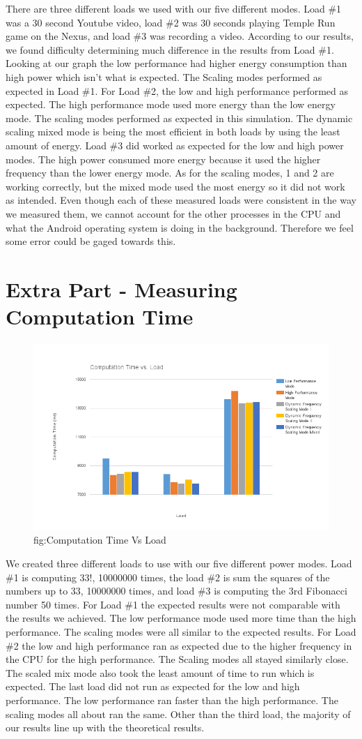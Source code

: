 \documentclass{article} %
\begin{document}
There are three different loads we used with our five different modes.  Load \#1 was a 30 second Youtube video, load \#2 was 30 seconds playing Temple Run game on the Nexus, and load \#3 was recording a video.  According to our results, we found difficulty determining much difference in the results from Load \#1.  Looking at our graph the low performance had higher energy consumption than high power which isn’t what is expected.  The Scaling modes performed as expected in Load \#1.  For Load \#2, the low and high performance performed as expected.  The high performance mode used more energy than the low energy mode.  The scaling modes performed as expected in this simulation.  The dynamic scaling mixed mode is being the most efficient in both loads by using the least amount of energy.  Load \#3 did worked as expected for the low and high power modes.  The high power consumed more energy because it used the higher frequency than the lower energy mode.  As for the scaling modes, 1 and 2 are working correctly, but the mixed mode used the most energy so it did not work as intended.  Even though each of these measured loads were consistent in the way we measured them, we cannot account for the other processes in the CPU and what the Android operating system is doing in the background.  Therefore we feel some error could be gaged towards this.  

\section{Extra Part - Measuring Computation Time}
\begin{figure}[!hbt]
\begin{center}
\includegraphics[width=.4\textwidth,keepaspectratio]{time_vs_load.png}
\end{center}
\caption{fig:Computation Time Vs Load}
\label{FIG-TRANSMITTER}
\end{figure}
We created three different loads to use with our five different power modes.  Load \#1 is computing 33!, 10000000 times, the load \#2 is sum the squares of the numbers up to 33, 10000000 times, and load \#3 is computing the 3rd Fibonacci number 50 times.  For Load \#1 the expected results were not comparable with the results we achieved.  The low performance mode used more time than the high performance.  The scaling modes were all similar to the expected results.  For Load \#2 the low and high performance ran as expected due to the higher frequency in the CPU for the high performance.  The Scaling modes all stayed similarly close.  The scaled mix mode also took the least amount of time to run which is expected.  The last load did not run as expected for the low and high performance.  The low performance ran faster than the high performance.  The scaling modes all about ran the same.  Other than the third load, the majority of our results line up with the theoretical results.  
\end{document}
